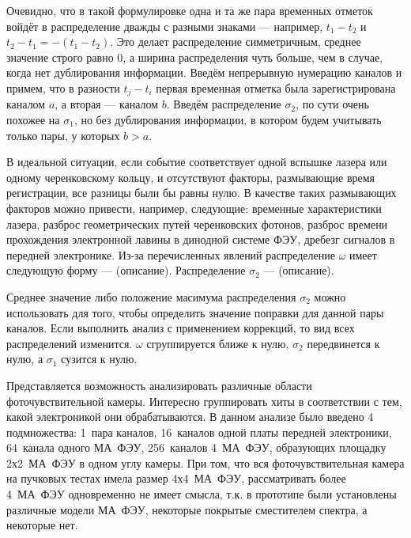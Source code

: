 Очевидно, что в такой формулировке одна и та же пара временных отметок войдёт в распределение дважды с разными знаками --- например, $ t_{1}-t_{2} $ и $ t_{2}-t_{1} = -(t_{1}-t_{2}) $. Это делает распределение симметричным, среднее значение строго равно 0, а ширина распределения чуть больше, чем в случае, когда нет дублирования информации. Введём непрерывную нумерацию каналов и примем, что в разности $ t_{j}-t_{i} $ первая временная отметка была зарегистрирована каналом $a$, а вторая --- каналом $b$. Введём распределение $ \sigma_{2} $, по сути очень похожее на $ \sigma_{1} $, но без дублирования информации, в котором будем учитывать только пары, у которых $ b > a $.

В идеальной ситуации, если событие соответствует одной вспышке лазера или одному черенковскому кольцу, и отсутствуют факторы, размывающие время регистрации, все разницы были бы равны нулю. В качестве таких размывающих факторов можно привести, например, следующие: временные характеристики лазера, разброс геометрических путей черенковских фотонов, разброс времени прохождения электронной лавины в динодной системе ФЭУ, дребезг сигналов в передней электронике. Из-за перечисленных явлений распределение $ \omega $ имеет следующую форму --- (описание). Распределение $ \sigma_{2} $ --- (описание).


Среднее значение либо положение масимума распределения $ \sigma_{2} $ можно использовать для того, чтобы определить значение поправки для данной пары каналов. Если выполнить анализ с применением коррекций, то вид всех распределений изменится. $ \omega $ сгруппируется ближе к нулю, $ \sigma_{2} $ передвинется к нулю, а $ \sigma_{1} $ сузится к нулю.

Представляется возможность анализировать различные области фоточувствительной камеры. Интересно группировать хиты в соответствии с тем, какой электроникой они обрабатываются. В данном анализе было введено 4 подмножества: 1~пара каналов, 16~каналов одной платы передней электроники, 64~канала одного МА~ФЭУ, 256~каналов 4~МА~ФЭУ, образующих площадку 2х2~МА~ФЭУ в одном углу камеры. При том, что вся фоточувствительная камера на пучковых тестах имела размер 4х4~МА~ФЭУ, рассматривать более 4~МА~ФЭУ одновременно не имеет смысла, т.к. в прототипе были установлены различные модели МА~ФЭУ, некоторые покрытые сместителем спектра, а некоторые нет.
